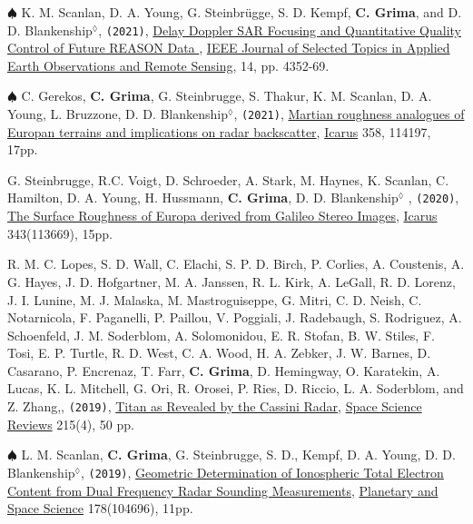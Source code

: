 \begin{etaremune}
\item
  $\spadesuit$ K. M. Scanlan, D. A. Young, G. Steinbrügge, S. D. Kempf, \textbf{C. Grima}, and D. D. Blankenship$^\lozenge$, \texttt{(2021)}, \href{https://ieeexplore.ieee.org/document/9399772?source=authoralert}{Delay Doppler SAR Focusing and Quantitative Quality Control of Future REASON Data \aiOpenAccessSquare}, \ul{IEEE Journal of Selected Topics in Applied Earth Observations and Remote Sensing}, 14, pp. 4352-69.

\item
  $\spadesuit$ C. Gerekos, \textbf{C. Grima}, G. Steinbrugge, S. Thakur, K. M. Scanlan, D. A. Young, L. Bruzzone, D. D. Blankenship$^\lozenge$, \texttt{(2021)}, \href{https://doi.org/10.1016/j.icarus.2020.114197}{Martian roughness analogues of Europan terrains and implications on radar backscatter}, \ul{Icarus} 358, 114197, 17pp.
  
\item
  G. Steinbrugge, R.C. Voigt, D. Schroeder, A. Stark, M. Haynes, K. Scanlan, C. Hamilton, D. A. Young, H. Hussmann, \textbf{C. Grima}, D. D. Blankenship$^\lozenge$ , \texttt{(2020)}, \href{https://www.sciencedirect.com/science/article/abs/pii/S0019103519301526}{The Surface Roughness of Europa derived from Galileo Stereo Images}, \ul{Icarus} 343(113669), 15pp.
  
\item
  R. M. C. Lopes, S. D. Wall, C. Elachi, S. P. D. Birch, P. Corlies, A. Coustenis, A. G. Hayes, J. D. Hofgartner, M. A. Janssen, R. L. Kirk, A. LeGall, R. D. Lorenz, J. I. Lunine, M. J. Malaska, M. Mastroguiseppe, G. Mitri, C. D. Neish, C. Notarnicola, F. Paganelli, P. Paillou, V. Poggiali, J. Radebaugh, S. Rodriguez, A. Schoenfeld, J. M. Soderblom, A. Solomonidou, E. R. Stofan, B. W. Stiles, F. Tosi, E. P. Turtle, R. D. West, C. A. Wood, H. A. Zebker, J. W. Barnes, D. Casarano, P. Encrenaz, T. Farr, \textbf{C. Grima}, D. Hemingway, O. Karatekin, A. Lucas, K. L. Mitchell, G. Ori, R. Orosei, P. Ries, D. Riccio, L. A. Soderblom, and Z. Zhang,, \texttt{(2019)}, \href{https://ui.adsabs.harvard.edu/abs/2019SSRv..215...33L/abstract}{Titan as Revealed by the Cassini Radar}, \ul{Space Science Reviews} 215(4), 50 pp.
  
\item
  $\spadesuit$ L. M. Scanlan, \textbf{C. Grima}, G. Steinbrugge, S. D., Kempf, D. A. Young, D. D. Blankenship$^\lozenge$, \texttt{(2019)}, \href{https://www.sciencedirect.com/science/article/pii/S0032063319300820}{Geometric Determination of Ionospheric Total Electron Content from Dual Frequency Radar Sounding Measurements}, \ul{Planetary and Space Science} 178(104696), 11pp.


\end{etaremune}
